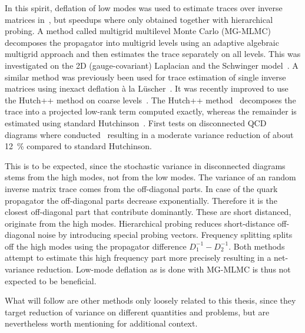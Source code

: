 In this spirit, deflation of low modes was used to estimate traces over inverse matrices in~\cite{Gambhir:2016uwp,Alcalde_2017}, but speedups where only obtained together with hierarchical probing.
A method called multigrid multilevel Monte Carlo (MG-MLMC) decomposes the propagator into multigrid levels using an adaptive algebraic multigrid approach and then estimates the trace separately on all levels.
This was investigated on the 2D (gauge-covariant) Laplacian and the Schwinger model~\cite{doi:10.1137/21M1441894:2022}.
A similar method was previously been used for trace estimation of single inverse matrices using inexact deflation à la Lüscher~\cite{Romero:2019psj}.
It was recently improved to use the Hutch++ method on coarse levels~\cite{Frommer:2022qiy}.
The Hutch++ method~\cite{doi:10.1137/1.9781611976496.16:2021} decomposes the trace into a projected low-rank term computed exactly, whereas the remainder is estimated using standard Hutchinson~\cite{Hutchinson01011990}.
First tests on disconnected QCD diagrams where conducted~\cite{Frommer:2025kfp} resulting in a moderate variance reduction of about \SI{12}{\percent} compared to standard Hutchinson.

This is to be expected, since the stochastic variance in disconnected diagrams stems from the high modes, not from the low modes.
The variance of an random inverse matrix trace comes from the off-diagonal parts.
In case of the quark propagator the off-diagonal parts decrease exponentially.
Therefore it is the closest off-diagonal part that contribute dominantly.
These are short distanced, \ie originate from the high modes.
Hierarchical probing reduces short-distance off-diagonal noise by introducing special probing vectors.
Frequency splitting splits off the high modes using the propagator difference $D_1^{-1} - D_2^{-1}$.
Both methods attempt to estimate this high frequency part more precisely resulting in a net-variance reduction.
Low-mode deflation as is done with MG-MLMC is thus not expected to be beneficial.

What will follow are other methods only loosely related to this thesis, since they target reduction of variance on different quantities and problems, but are nevertheless worth mentioning for additional context.

